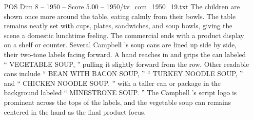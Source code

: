 \begin{textsample}{POS Dim 8 – 1950 – Score 5.00 – 1950/tv\_com\_1950\_19.txt}
The children are shown once more around the table, eating calmly from their bowls.
The table remains neatly set with cups, plates, sandwiches, and soup bowls, giving the scene a domestic lunchtime feeling.
The commercial ends with a product display on a shelf or counter.
Several Campbell ’s soup cans are lined up side by side, their two-tone labels facing forward.
A hand reaches in and grips the can labeled “ VEGETABLE SOUP, ” pulling it slightly forward from the row.
Other readable cans include “ BEAN WITH BACON SOUP, ” “ TURKEY NOODLE SOUP, ” and “ CHICKEN NOODLE SOUP, ” with a taller can or package in the background labeled “ MINESTRONE SOUP. ” The Campbell ’s script logo is prominent across the tops of the labels, and the vegetable soup can remains centered in the hand as the final product focus.

\end{textsample}
